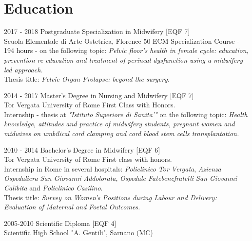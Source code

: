 \documentclass[11pt]{friggeri-cv}
\begin{document}
\vspace{-10pt}
\section{Education}
\begin{entrylist}
  \entry
  {2017 - 2018}
  {Postgraduate Specialization in Midwifery [\small EQF 7]}
  {\\Scuola Elementale di Arte Ostetrica, Florence}
  {50 ECM Specialization Course - 194 hours - on the following topic: 
  \emph{Pelvic floor's health in female cycle: education, prevention 
  re-education and treatment of perineal dysfunction using a midwifery-led 
  approach.}\\
  Thesis title: \emph{Pelvic Organ Prolapse: beyond the surgery}.\\}
  
  \entry
  {2014 - 2017}
  {Master's Degree in Nursing and Midwifery [\small EQF 7]}
  {\\Tor Vergata University of Rome}
  {First Class with Honors. \\Internship - thesis at \textit{"Istituto 
  Superiore di Sanita'"} on the following topic: \textit{Health knowledge, 
  attitudes and practice of midwifery students, pregnant women and midwives on 
  umbilical cord clamping and cord blood stem cells transplantation.}\\}
  
  \entry
  {2010 - 2014}
  {Bachelor's Degree in Midwifery [\small EQF 6]}
  {\\Tor Vergata University of Rome}
  {First class with honors.\\
  Internship in Rome in several hospitals: \textit{Policlinico Tor Vergata}, 
  \textit{Azienza Ospedaliera San Giovanni Addolorata}, \textit{Ospedale 
  Fatebenefratelli San Giovanni Calibita} and \textit{Policlinico Casilino}.\\
  Thesis title: \textit{Survey on Women's Positions during Labour and Delivery: 
  Evaluation of Maternal and Foetal Outcomes.}\\}
  
  \entry
  {2005-2010}
  {Scientific Diploma [\small EQF 4]}
  {\\Scientific High School "A. Gentili", Sarnano (MC)}
  {}
\end{entrylist}

\vspace{-25pt}
\end{document}
